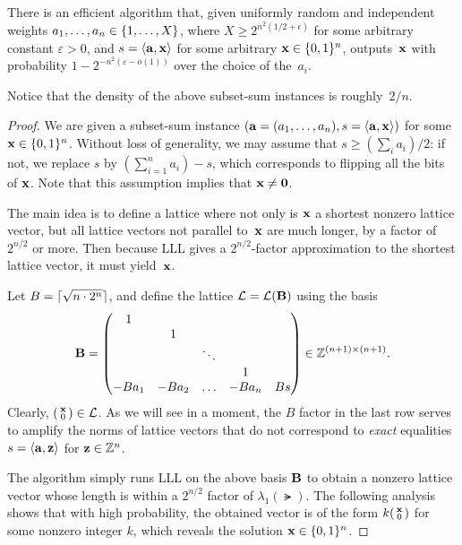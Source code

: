 \documentclass[11pt]{article}
\begin{document}
\begin{theorem}
  There is an efficient algorithm that, given uniformly random and
  independent weights $a_{1},\ldots, a_{n} \in \{1,\ldots, X\}$,
  where $X \geq 2^{n^2(1/2+\epsilon)}$ for some arbitrary constant
  $\varepsilon > 0$, and $s = \langle\mathbf{a},\mathbf{x}\rangle$ for some arbitrary
  $\mathbf{x} \in \{0,1\}^{n}$, outputs~$\mathbf{x}$ with probability
  $1-2^{-n^{2} (\varepsilon - o(1))}$ over the choice of the~$a_{i}$.
\end{theorem}
Notice that the density of the above subset-sum instances is
roughly~$2/n$.

\begin{proof}
  We are given a subset-sum instance
  $(\mathbf{a} = (a_{1}, \ldots, a_{n}), s = \langle\mathbf{a}, \mathbf{x}\rangle)$ for
  some $\mathbf{x} \in \{0,1\}^{n}$. Without loss of generality, we may assume
  that $s \geq (\sum_{i} a_i)/2$: if not, we replace $s$ by
  $(\sum_{i=1}^{n} a_i) - s$, which corresponds to flipping all the
  bits of $\mathbf{x}$. Note that this assumption implies that
  $\mathbf{x} \neq \mathbf{0}$.
    
  The main idea is to define a lattice where not only is $\mathbf{x}$ a
  shortest nonzero lattice vector, but all lattice vectors not
  parallel to~$\mathbf{x}$ are much longer, by a factor of~$2^{n/2}$ or
  more. Then because LLL gives a $2^{n/2}$-factor approximation to the
  shortest lattice vector, it must yield~$\mathbf{x}$.

  Let $B = \lceil\sqrt{n\cdot 2^n}\rceil$, and define the lattice
  $\mathcal{L} = \mathcal{L}(\mathbf{B})$ using the basis
  \[ \mathbf{B} =
    \begin{pmatrix}
      1 & & & & \\
        & 1 & & & \\
        & & \ddots & & \\
        & & & 1 & \\
      -B a_1 & -B a_2 & \ldots & -B a_n & B s \\
    \end{pmatrix}
    \in \mathbb{Z}^{(n+1)\times (n+1)}. \] Clearly,
  $\left(\begin{smallmatrix}\mathbf{x} \\ 0\end{smallmatrix}\right) \in \mathcal{L}$. As we will see in a moment, the $B$
  factor in the last row serves to amplify the norms of lattice
  vectors that do not correspond to \emph{exact} equalities
  $s = \langle\mathbf{a},\mathbf{z}\rangle$ for $\mathbf{z} \in \mathbb{Z}^{n}$.

  The algorithm simply runs LLL on the above basis $\mathbf{B}$ to obtain a
  nonzero lattice vector whose length is within a $2^{n/2}$ factor of
  $\lambda_{1}(\lat)$. The following analysis shows that with high
  probability, the obtained vector is of the form
  $k \smlmat{\vecx \\ 0}$ for some nonzero integer $k$, which reveals
  the solution $\mathbf{x} \in \{0,1\}^{n}$.
  

\end{proof}
\end{document}
